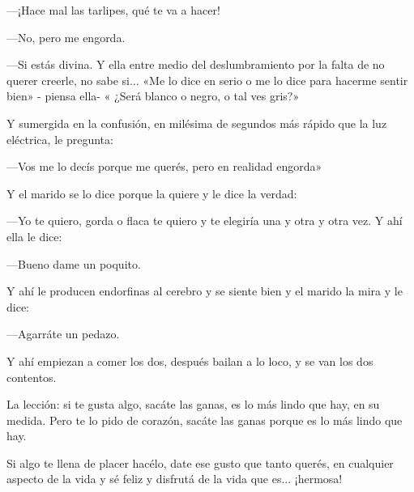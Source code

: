 \documentclass[11pt,twoside,openright,a5paper]{book}
\begin{document}
---¡Hace mal las tarlipes, qué te  va a hacer!

---No, pero me engorda.

---Si estás divina. Y  ella entre medio del deslumbramiento por la falta de no querer creerle, no sabe si... «Me  lo dice en serio o me lo dice para hacerme sentir bien» - piensa ella- « ¿Será blanco o negro, o tal ves gris?»

Y sumergida en la confusión,  en milésima de segundos más rápido que la luz eléctrica, le pregunta:

---Vos me lo decís porque me querés,  pero en realidad engorda»

Y el marido se lo dice porque la quiere y le dice la verdad:

---Yo te quiero,  gorda o flaca te quiero y te elegiría  una y otra y otra vez. Y ahí ella le dice:

---Bueno dame un poquito.

Y ahí le producen endorfinas al cerebro y se siente bien y el marido la mira y le dice:

---Agarráte un pedazo.

Y ahí empiezan a comer los dos, después bailan a lo loco, y se van los dos contentos.

La lección: si te gusta algo, sacáte las  ganas,  es lo más lindo que hay,  en su medida. Pero te lo pido de corazón, sacáte las ganas porque es lo más lindo que hay.

Si algo te llena de placer hacélo, date ese gusto que tanto querés, en cualquier aspecto de la vida y sé feliz y disfrutá de la vida que es... ¡hermosa!
\end{document}
